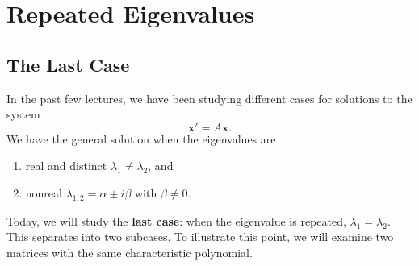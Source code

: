 \documentclass[11pt,letterpaper]{article}
\begin{document}

\section{Repeated Eigenvalues}

\subsection{The Last Case}
In the past few lectures, we have been studying different cases for solutions to the system
$$
    \mathbf{x}' = A \mathbf{x}.
$$
We have the general solution when the eigenvalues are 
\begin{enumerate}
    \item[a)] real and distinct $\lambda_1\ne \lambda_2$, and
    \item[b)] nonreal $\lambda_{1,2}=\alpha \pm i\beta$ with $\beta\ne0$.
\end{enumerate}
Today, we will study the \textbf{last case}: when the eigenvalue is repeated, $\lambda_1=\lambda_2$. This  separates into two subcases. To illustrate this point, we will examine two matrices with the same characteristic polynomial.
\end{document}
